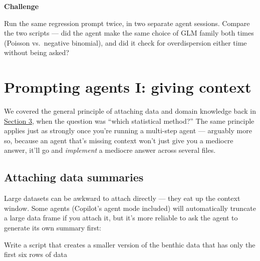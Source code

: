 \documentclass[
  letterpaper,
  DIV=11,
  numbers=noendperiod]{scrreprt}
\begin{document}
\begin{tcolorbox}[enhanced jigsaw, toprule=.15mm, rightrule=.15mm, left=2mm, leftrule=.75mm, breakable, opacityback=0, arc=.35mm, colframe=quarto-callout-important-color-frame, bottomrule=.15mm, colback=white]
\begin{minipage}[t]{5.5mm}
\textcolor{quarto-callout-important-color}{\faExclamation}
\end{minipage}%
\begin{minipage}[t]{\textwidth - 5.5mm}

\vspace{-3mm}\textbf{Challenge}\vspace{3mm}

Run the same regression prompt twice, in two separate agent sessions.
Compare the two scripts --- did the agent make the same choice of GLM
family both times (Poisson vs.~negative binomial), and did it check for
overdispersion either time without being asked?

\end{minipage}%
\end{tcolorbox}

\chapter{Prompting agents I: giving
context}\label{prompting-agents-i-giving-context}

We covered the general principle of attaching data and domain knowledge
back in
\href{../section-3-workflows/01-select-statistical-approach.qmd}{Section
3}, when the question was ``which statistical method?'' The same
principle applies just as strongly once you're running a multi-step
agent --- arguably more so, because an agent that's missing context
won't just give you a mediocre answer, it'll go and \emph{implement} a
mediocre answer across several files.

\section{Attaching data summaries}\label{attaching-data-summaries}

Large datasets can be awkward to attach directly --- they eat up the
context window. Some agents (Copilot's agent mode included) will
automatically truncate a large data frame if you attach it, but it's
more reliable to ask the agent to generate its own summary first:

\begin{tcolorbox}[enhanced jigsaw, bottomtitle=1mm, leftrule=.75mm, breakable, colbacktitle=quarto-callout-note-color!10!white, colframe=quarto-callout-note-color-frame, coltitle=black, toprule=.15mm, rightrule=.15mm, left=2mm, bottomrule=.15mm, title=\textcolor{quarto-callout-note-color}{\faInfo}\hspace{0.5em}{Prompt}, opacityback=0, arc=.35mm, toptitle=1mm, titlerule=0mm, opacitybacktitle=0.6, colback=white]

Write a script that creates a smaller version of the benthic data that
has only the first six rows of data

\end{tcolorbox}
\end{document}

